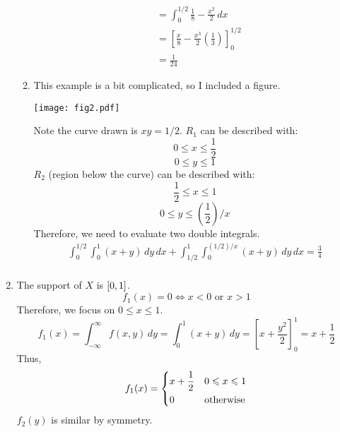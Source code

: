\begin{Example}{}{}
\begin{enumerate}[label=(\roman*)]
\begin{enumerate}[label=(\alph*)]
\begin{align*}
                             & =\int_{0}^{1/2} \frac{1}{8} -\frac{x^2}{2}\, d{x}                              \\
                             & =\left[ \frac{x}{8} -\frac{x^3}{2} \left( \frac{1}{3}  \right) \right]_0^{1/2} \\
                             & =\frac{1}{24}
                        \end{align*}
                  \item This example is a bit complicated,
                        so I included a figure.
                        \begin{center}
                            \texttt{[image: fig2.pdf]}
                        \end{center}
                        Note the curve drawn is $ xy=1/2 $.
                        $ R_1 $ can be described with:
                        \[ 0\leqslant x\leqslant \frac{1}{2}   \]
                        \[ 0\leqslant y\leqslant 1 \]
                        $ R_2 $ (region below the curve) can be described with:
                        \[ \frac{1}{2} \leqslant x\leqslant 1 \]
                        \[ 0\leqslant y\leqslant \left( \frac{1}{2} \right)/x  \]
                        Therefore, we need to evaluate two double integrals.
                        \begin{align*}
                            \int_{0}^{1/2} \int_{0}^{1} (x+y)\, d{y} \, d{x}
                            +\int_{1/2}^{1} \int_{0}^{(1/2)/x} (x+y)\, d{y} \, d{x}=\frac{3}{4} \\
                        \end{align*}
              \end{enumerate}
        \item The support of $ X $ is $ \interval{0}{1} $.
              \[ f_1(x)=0\iff x<0\text{ or } x>1 \]
              Therefore, we focus on $ 0\leqslant x\leqslant 1 $.
              \[ f_1(x)=\int_{-\infty}^{\infty} f(x,y)\, d{y}
                  =\int_{0}^{1} (x+y)\, d{y}=\left[ x+\frac{y^2}{2} \right]_0^1
                  =x+\frac{1}{2} \]
              Thus,
              \[ f_1(x)=
                  \begin{dcases}
                      x+\frac{1}{2} & 0\leqslant x\leqslant 1 \\
                      0             & \text{otherwise}
                  \end{dcases} \]
              $ f_2(y) $ is similar by symmetry.
    \end{enumerate}
\end{Example}
